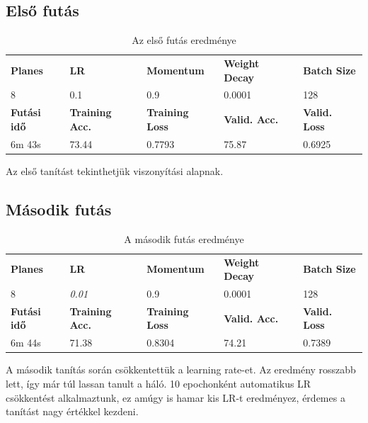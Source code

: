 \newpage
\subsection{Első futás}
\begin{table}[h]
	\begin{tabular}{|l|l|l|l|l|}
		\hline
		\textbf{Planes} & \textbf{LR} & \textbf{Momentum} & \textbf{Weight Decay} & \textbf{Batch Size} \\
		8 & 0.1 & 0.9 & 0.0001 & 128 \\ \hline
		\textbf{Futási idő} & \textbf{Training Acc.} & \textbf{Training Loss} & \textbf{Valid. Acc.} & \textbf{Valid. Loss} \\
		6m 43s & 73.44 & 0.7793 & 75.87 & 0.6925 \\ \hline
	\end{tabular}
	\caption{Az első futás eredménye}
\end{table}
Az első tanítást tekinthetjük viszonyítási alapnak.

\subsection{Második futás}
\begin{table}[h]
	\begin{tabular}{|l|l|l|l|l|}
		\hline
		\textbf{Planes} & \textbf{LR} & \textbf{Momentum} & \textbf{Weight Decay} & \textbf{Batch Size} \\
		8 & \textit{0.01} & 0.9 & 0.0001 & 128 \\ \hline
		\textbf{Futási idő} & \textbf{Training Acc.} & \textbf{Training Loss} & \textbf{Valid. Acc.} & \textbf{Valid. Loss} \\
		6m 44s & 71.38 & 0.8304 & 74.21 & 0.7389 \\ \hline
	\end{tabular}
	\caption{A második futás eredménye}
\end{table}
A második tanítás során csökkentettük a learning rate-et. Az eredmény rosszabb lett, így már túl lassan tanult a háló. 10 epochonként automatikus LR csökkentést alkalmaztunk, ez amúgy is hamar kis LR-t eredményez, érdemes a tanítást nagy értékkel kezdeni.


